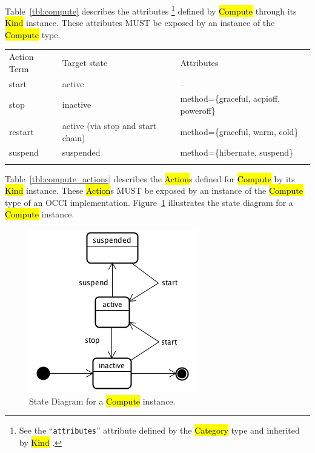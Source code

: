 \documentclass[10pt,a4paper]{article}
\begin{document}
Table~\ref{tbl:compute} describes the attributes%
\footnote{See the ``{\tt attributes}'' attribute defined by the \hl{Category}
type and inherited by \hl{Kind} \cite{occi:core}.} 
defined by \hl{Compute} through its \hl{Kind} instance. These attributes
MUST be exposed by an instance of the \hl{Compute} type.

{
	\begin{tabular}{lll}
	\toprule
	Action Term & Target state & Attributes \\
	\colrule
	start & active & -- \\
	stop & inactive & method=\{graceful, acpioff, poweroff\} \\
	restart & active (via stop and start chain) & method=\{graceful, warm, cold\} \\
	suspend & suspended & method=\{hibernate, suspend\} \\
	\botrule
	\end{tabular}
}

Table~\ref{tbl:compute_actions} describes the \hl{Action}s defined for
\hl{Compute} by its \hl{Kind} instance. These \hl{Action}s MUST be exposed 
by an instance of the \hl{Compute} type of an OCCI implementation. 
Figure~\ref{fig:compute_state} illustrates the state diagram for a \hl{Compute} instance.

\begin{figure}[!h]
	\centering
	\includegraphics[scale=0.4]{figs/compute-state.png}
	\caption{State Diagram for a \hl{Compute} instance.}
	\label{fig:compute_state}
\end{figure}
\end{document}
